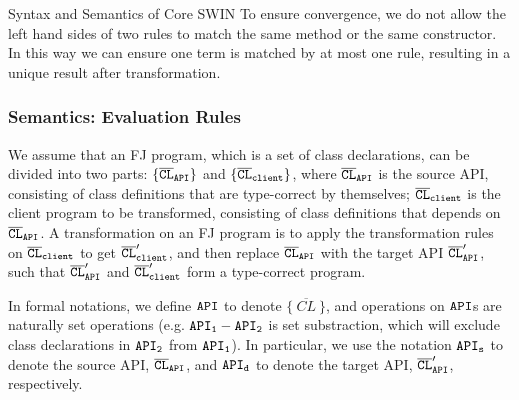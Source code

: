 \begin{section}{Syntax and Semantics of Core SWIN}
To ensure convergence, we do not allow the left hand sides of
two rules to match the same method or the same constructor. In this
way we can ensure one term is matched by at most one rule, resulting
in a unique result after transformation.


\subsubsection{Semantics: Evaluation Rules}

We assume that an FJ program, which is a set of class declarations, can be divided into two parts: 
$\tt\{\overline{CL}_{API}\}$ and $\tt\{\overline{CL}_{client}\}$,
where $\tt\overline{CL}_{API}$ is the source API,
consisting of class definitions that are
type-correct by themselves; $\tt\overline{CL}_{client}$ is the client
program to be transformed, consisting of class definitions that depends on $\tt\overline{CL}_{API}$. A
transformation on an FJ program is to apply the transformation rules on 
$\tt\overline{CL}_{client}$ to get $\tt\overline{CL}'_{client}$, and then replace $\tt\overline{CL}_{API}$
with the target API $\tt\overline{CL}'_{API}$, such that
$\tt\overline{CL}'_{API}$ and $\tt\overline{CL}'_{client}$ form a
type-correct program. 

In formal notations, we define $\tt API$ to denote $\{~\overline{CL}~\}$, and operations on $\tt API$s are naturally set operations (e.g. $\tt API_1-API_2$ is set substraction, which will exclude class declarations in $\tt API_2$ from $\tt API_1$). In particular, we use the notation $\tt API_s$ to denote the
source API, $\tt\overline{CL}_{API}$, and $\tt API_d$ to denote the target
API, $\tt\overline{CL}'_{API}$, respectively. 





\end{section}
